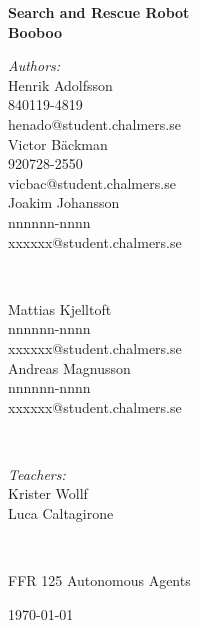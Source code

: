 \begin{titlepage}

\begin{center}


\bigskip
\bigskip

{ \huge \bfseries Search and Rescue Robot \\[0.5cm] Booboo}\



\bigskip
\bigskip
\bigskip
\bigskip

\begin{minipage}{0.45\textwidth}
\begin{flushleft} \large
\emph{Authors:}\\
Henrik Adolfsson\\
840119-4819\\
henado@student.chalmers.se\\
Victor Bäckman\\
920728-2550\\
vicbac@student.chalmers.se\\
Joakim Johansson\\
nnnnnn-nnnn\\
xxxxxx@student.chalmers.se\\
\end{flushleft}
\end{minipage}
~
~
\begin{minipage}{0.45\textwidth}
\begin{flushleft} \large
Mattias Kjelltoft\\
nnnnnn-nnnn\\
xxxxxx@student.chalmers.se\\
Andreas Magnusson\\
nnnnnn-nnnn\\
xxxxxx@student.chalmers.se
\\[1cm]
\bigskip
\end{flushleft}
\end{minipage}
\\[2cm]
\begin{minipage}{0.45\textwidth}
\begin{flushleft} \large
\emph{Teachers:}\\
Krister Wollf \\
Luca Caltagirone
\end{flushleft}
\end{minipage}
~~
\begin{minipage}{0.45\textwidth}
\begin{flushleft} \large
\bigskip
\end{flushleft}
\end{minipage}

\vfill


\large {FFR 125 Autonomous Agents}

\large \today

\end{center}

\end{titlepage}